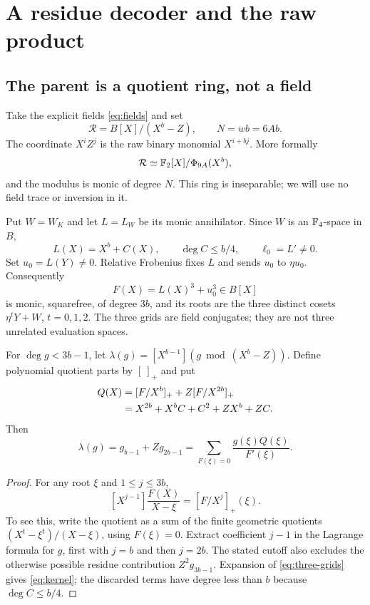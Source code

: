 \section{A residue decoder and the raw product}\label{sec:decoding}

\subsection{The parent is a quotient ring, not a field}
Take the explicit fields \eqref{eq:fields} and set
\[
 \mathcal R=B[X]/(X^b-Z),\qquad N=wb=6Ab.
\]
The coordinate $X^iZ^j$ is the raw binary monomial $X^{i+bj}$.
More formally
\[
 \mathcal R\simeq\mathbb F_2[X]/\Phi_{9A}(X^b),
\]
and the modulus is monic of degree $N$. This ring is inseparable;
we will use no field trace or inversion in it.

Put $W=W_K$ and let $L=L_W$ be its monic annihilator. Since $W$ is
an $\mathbb F_4$-space in $B$,
\[
 L(X)=X^b+C(X),\qquad \deg C\leq b/4,\qquad
 \ell_0=L'\ne0.
\]
Set $u_0=L(Y)\ne0$. Relative Frobenius fixes $L$ and sends $u_0$
to $\eta u_0$. Consequently
\begin{equation}\label{eq:three-grids}
 F(X)=L(X)^3+u_0^3\in B[X]
\end{equation}
is monic, squarefree, of degree $3b$, and its roots are the three
distinct cosets $\eta^tY+W$, $t=0,1,2$.
The three grids are field conjugates; they are not three unrelated
evaluation spaces.

\begin{lemma}\label{lem:kernel}
For $\deg g<3b-1$, let
$\lambda(g)=[X^{b-1}](g\bmod(X^b-Z))$. Define polynomial quotient
parts by $[\ ]_+$ and put
\begin{align}
 Q(X)&=[F/X^b]_++Z[F/X^{2b}]_+\notag\\
 &=X^{2b}+X^bC+C^2+ZX^b+ZC.\label{eq:kernel}
\end{align}
Then
\begin{equation}\label{eq:lagrange}
 \lambda(g)=g_{b-1}+Zg_{2b-1}
 =\sum_{F(\xi)=0}\frac{g(\xi)Q(\xi)}{F'(\xi)}.
\end{equation}
\end{lemma}
\begin{proof}
For any root $\xi$ and $1\leq j\leq3b$,
\[
 [X^{j-1}]\frac{F(X)}{X-\xi}=[F/X^j]_+(\xi).
\]
To see this, write the quotient as a sum of the finite geometric
quotients $(X^t-\xi^t)/(X-\xi)$, using $F(\xi)=0$.
Extract coefficient $j-1$ in the Lagrange formula for $g$, first
with $j=b$ and then $j=2b$. The stated cutoff also excludes the
otherwise possible residue contribution $Z^2g_{3b-1}$.
Expansion of \eqref{eq:three-grids} gives \eqref{eq:kernel}; the
discarded terms have degree less than $b$ because $\deg C\leq b/4$.
\end{proof}

